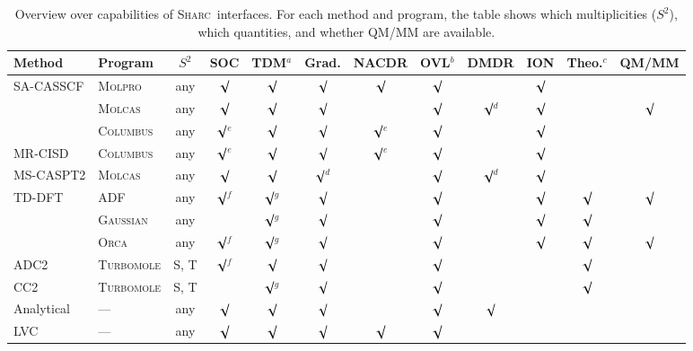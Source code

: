 \documentclass[a4paper,10pt,DIV=15,openany]{scrbook}
\newcommand{\sharc}{\textsc{Sharc}}
\begin{document}
\begin{table}[htb]
  \newcommand{\chk}{\ensuremath{\surd}}
  \renewcommand{\tabcolsep}{4.5pt}
  \centering
  \caption[Overview over capabilities of \sharc\ interfaces.]{Overview over capabilities of \sharc\ interfaces. For each method and program, the table shows which multiplicities ($S^2$), which quantities, and whether QM/MM are available.}
  \label{tab:interfaces}
  \begin{tabular}{ll cccccccccc}
    \hline
    Method      &Program              &$S^2$   &SOC         &TDM$^a$     &Grad.       &NACDR       &OVL$^b$ &DMDR     &ION  &Theo.$^c$   &QM/MM\\
    \hline
    SA-CASSCF   &\textsc{Molpro}      &any     &\chk        &\chk        &\chk        &\chk        &\chk    &         &\chk &            &     \\
                &\textsc{Molcas}      &any     &\chk        &\chk        &\chk        &            &\chk    &\chk$^d$ &\chk &            &\chk \\
                &\textsc{Columbus}    &any     &\chk$^e$    &\chk        &\chk        &\chk$^e$    &\chk    &         &\chk &            &     \\
    MR-CISD     &\textsc{Columbus}    &any     &\chk$^e$    &\chk        &\chk        &\chk$^e$    &\chk    &         &\chk &            &     \\
    MS-CASPT2   &\textsc{Molcas}      &any     &\chk        &\chk        &\chk$^d$    &            &\chk    &\chk$^d$ &\chk &            &     \\
    TD-DFT      &\textsc{ADF}         &any     &\chk$^f$    &\chk$^g$    &\chk        &            &\chk    &         &\chk &\chk        &\chk \\
                &\textsc{Gaussian}    &any     &            &\chk$^g$    &\chk        &            &\chk    &         &\chk &\chk        &     \\
                &\textsc{Orca}        &any     &\chk$^f$    &\chk$^g$    &\chk        &            &\chk    &         &\chk &\chk        &\chk \\
    ADC2        &\textsc{Turbomole}   &S, T    &\chk$^f$    &\chk        &\chk        &            &\chk    &         &     &\chk        &     \\
    CC2         &\textsc{Turbomole}   &S, T    &            &\chk$^g$    &\chk        &            &\chk    &         &     &\chk        &     \\
    Analytical  &---                  &any     &\chk        &\chk        &\chk        &            &\chk    &\chk     &     &            &     \\
    LVC         &---                  &any     &\chk        &\chk        &\chk        &\chk        &\chk    &         &     &            &     \\
    \hline
  \end{tabular}


\end{table}
\end{document}
